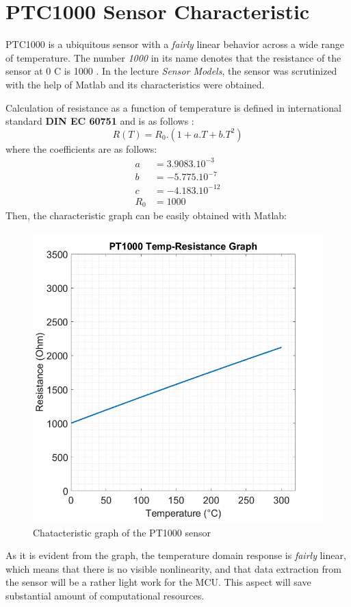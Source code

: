 \section*{PTC1000 Sensor Characteristic}

PTC1000 is a ubiquitous sensor with a \textit{fairly} linear behavior across a wide range of temperature. The number \textit{1000} in its name denotes that the resistance of the sensor at 0 \degree C is 1000 \ohm . In the lecture \textit{Sensor Models}, the sensor was scrutinized with the help of Matlab and its characteristics were obtained.

Calculation of resistance as a function of temperature is defined in international standard \textbf{DIN EC 60751} and is as follows \cite{Pt1000} \cite{DIN60751}:
\begin{equation}
    R(T) = R_0.(1 + a.T + b.T^2)
\end{equation}
where the coefficients are as follows:
\begin{align}
    a &= 3.9083.10^{-3}\\
    b &= -5.775.10^{-7}\\
    c &= -4.183.10^{-12}\\
    R_0 &= 1000
\end{align}
Then, the characteristic graph can be easily obtained with Matlab:

\begin{figure}[H]
    \centering
    \includegraphics[scale=0.45]{../pics/tempresgraph}
    \caption{Chatacteristic graph of the PT1000 sensor}
\end{figure}
As it is evident from the graph, the temperature domain response is \textit{fairly} linear, which means that there is no visible nonlinearity, and that data extraction from the sensor will be a rather light work for the MCU. This aspect will save substantial amount of computational resources.

